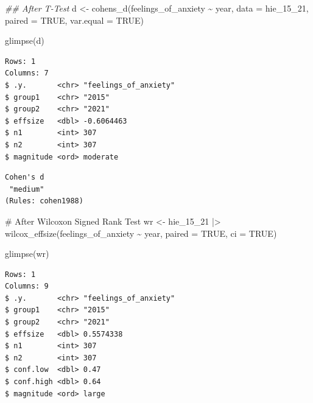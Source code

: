 \documentclass[
  letterpaper,
]{krantz}
\makeatletter
\newenvironment{Shaded}{\begin{snugshade}}{\end{snugshade}}
\newcommand{\AttributeTok}[1]{\textcolor[rgb]{0.40,0.45,0.13}{#1}}
\newcommand{\CommentTok}[1]{\textcolor[rgb]{0.37,0.37,0.37}{#1}}
\newcommand{\ConstantTok}[1]{\textcolor[rgb]{0.56,0.35,0.01}{#1}}
\newcommand{\DocumentationTok}[1]{\textcolor[rgb]{0.37,0.37,0.37}{\textit{#1}}}
\newcommand{\FunctionTok}[1]{\textcolor[rgb]{0.28,0.35,0.67}{#1}}
\newcommand{\NormalTok}[1]{\textcolor[rgb]{0.00,0.23,0.31}{#1}}
\newcommand{\OtherTok}[1]{\textcolor[rgb]{0.00,0.23,0.31}{#1}}
\newcommand{\SpecialCharTok}[1]{\textcolor[rgb]{0.37,0.37,0.37}{#1}}
\newenvironment{kframe}{%
\medskip{}
\setlength{\fboxsep}{.8em}
 \def\at@end@of@kframe{}%
 \ifinner\ifhmode%
  \def\at@end@of@kframe{\end{minipage}}%
  \begin{minipage}{\columnwidth}%
 \fi\fi%
 \def\FrameCommand##1{\hskip\@totalleftmargin \hskip-\fboxsep
 \colorbox{shadecolor}{##1}\hskip-\fboxsep
     \hskip-\linewidth \hskip-\@totalleftmargin \hskip\columnwidth}%
 \MakeFramed {\advance\hsize-\width
   \@totalleftmargin\z@ \linewidth\hsize
   \@setminipage}}%
 {\par\unskip\endMakeFramed%
 \at@end@of@kframe}
\renewenvironment{Shaded}{\begin{kframe}}{\end{kframe}}
\makeatother
\begin{document}
\begin{Shaded}
\begin{Highlighting}[]
\DocumentationTok{\#\# After T{-}Test}
\NormalTok{d }\OtherTok{\textless{}{-}} \FunctionTok{cohens\_d}\NormalTok{(feelings\_of\_anxiety }\SpecialCharTok{\textasciitilde{}}\NormalTok{ year,}
               \AttributeTok{data =}\NormalTok{ hie\_15\_21,}
               \AttributeTok{paired =} \ConstantTok{TRUE}\NormalTok{,}
               \AttributeTok{var.equal =} \ConstantTok{TRUE}\NormalTok{)}

\FunctionTok{glimpse}\NormalTok{(d)}
\end{Highlighting}
\end{Shaded}

\begin{verbatim}
Rows: 1
Columns: 7
$ .y.       <chr> "feelings_of_anxiety"
$ group1    <chr> "2015"
$ group2    <chr> "2021"
$ effsize   <dbl> -0.6064463
$ n1        <int> 307
$ n2        <int> 307
$ magnitude <ord> moderate
\end{verbatim}

\begin{Shaded}
\end{Shaded}

\begin{verbatim}
Cohen's d 
 "medium" 
(Rules: cohen1988)
\end{verbatim}

\begin{Shaded}
\begin{Highlighting}[]
\CommentTok{\# After Wilcoxon Signed Rank Test}
\NormalTok{wr }\OtherTok{\textless{}{-}}
\NormalTok{  hie\_15\_21 }\SpecialCharTok{|\textgreater{}}
  \FunctionTok{wilcox\_effsize}\NormalTok{(feelings\_of\_anxiety }\SpecialCharTok{\textasciitilde{}}\NormalTok{ year,}
                   \AttributeTok{paired =} \ConstantTok{TRUE}\NormalTok{, }\AttributeTok{ci =} \ConstantTok{TRUE}\NormalTok{)}

\FunctionTok{glimpse}\NormalTok{(wr)}
\end{Highlighting}
\end{Shaded}

\begin{verbatim}
Rows: 1
Columns: 9
$ .y.       <chr> "feelings_of_anxiety"
$ group1    <chr> "2015"
$ group2    <chr> "2021"
$ effsize   <dbl> 0.5574338
$ n1        <int> 307
$ n2        <int> 307
$ conf.low  <dbl> 0.47
$ conf.high <dbl> 0.64
$ magnitude <ord> large
\end{verbatim}
\end{document}
